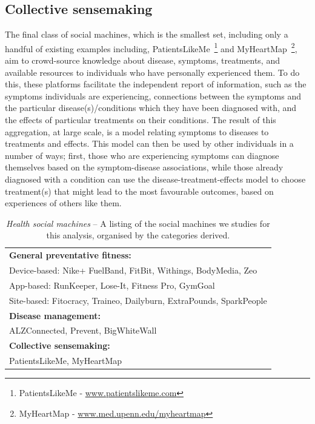 \documentclass{sig-alternate}
\begin{document}
\subsection{Collective sensemaking}
The final class of social machines, which is the smallest set,
including only a handful of existing examples including,
PatientsLikeMe~\footnote{PatientsLikeMe -
  \url{www.patientslikeme.com}} and MyHeartMap~\footnote{MyHeartMap -
  \url{www.med.upenn.edu/myheartmap}}, aim to crowd-source knowledge
about disease, symptoms, treatments, and available resources to
individuals who have personally experienced them.  To do this, these
platforms facilitate the independent report of information, such as
the symptoms individuals are experiencing, connections between the
symptoms and the particular disease(s)/conditions which they have been
diagnosed with, and the effects of particular treatments on their
conditions.  The result of this aggregation, at large scale, is a
model relating symptoms to diseases to treatments and effects.  This
model can then be used by other individuals in a number of ways;
first, those who are experiencing symptoms can diagnose themselves
based on the symptom-disease associations, while those already
diagnosed with a condition can use the disease-treatment-effects model
to choose treatment(s) that might lead to the most favourable
outcomes, based on experiences of others like them.

\begin{table}[tb]
\begin{center}
\begin{tabular}{|p{8cm}|}
\hline
{\bf General preventative fitness:} \\
Device-based: Nike+ FuelBand, FitBit, Withings, BodyMedia, Zeo \\
App-based: RunKeeper, Lose-It, Fitness Pro, GymGoal \\
Site-based: Fitocracy, Traineo, Dailyburn, ExtraPounds, SparkPeople  \\
\hline
{\bf Disease management:} \\
ALZConnected, Prevent, BigWhiteWall \\
\hline
{\bf Collective sensemaking:} \\
PatientsLikeMe, MyHeartMap \\
\hline
\end{tabular}
\end{center}
\caption{\emph{Health social machines} -- A listing of the social
  machines we studies for this analysis, organised by the categories
  derived.} \label{table:clusters}
\end{table}
\end{document}
